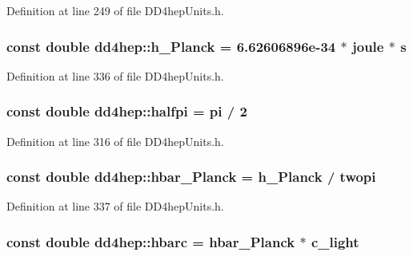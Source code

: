 Definition at line 249 of file DD4hepUnits.h.\hypertarget{namespacedd4hep_a673d90bb18d025dec577177927fac9f0}{
\subsubsection[{h\_\-Planck}]{\setlength{\rightskip}{0pt plus 5cm}const double {\bf dd4hep::h\_\-Planck} = 6.62606896e-\/34 $\ast$ joule $\ast$ s}}
\label{namespacedd4hep_a673d90bb18d025dec577177927fac9f0}


Definition at line 336 of file DD4hepUnits.h.\hypertarget{namespacedd4hep_a6681c641778caec7c8626e0d666a1be7}{
\subsubsection[{halfpi}]{\setlength{\rightskip}{0pt plus 5cm}const double {\bf dd4hep::halfpi} = {\bf pi} / 2}}
\label{namespacedd4hep_a6681c641778caec7c8626e0d666a1be7}


Definition at line 316 of file DD4hepUnits.h.\hypertarget{namespacedd4hep_abb25342c5e225d62446e9546e412bdcf}{
\subsubsection[{hbar\_\-Planck}]{\setlength{\rightskip}{0pt plus 5cm}const double {\bf dd4hep::hbar\_\-Planck} = {\bf h\_\-Planck} / {\bf twopi}}}
\label{namespacedd4hep_abb25342c5e225d62446e9546e412bdcf}


Definition at line 337 of file DD4hepUnits.h.\hypertarget{namespacedd4hep_aee6340c5f86bb7ae1edcc2a90efa056e}{
\subsubsection[{hbarc}]{\setlength{\rightskip}{0pt plus 5cm}const double {\bf dd4hep::hbarc} = {\bf hbar\_\-Planck} $\ast$ {\bf c\_\-light}}}
\label{namespacedd4hep_aee6340c5f86bb7ae1edcc2a90efa056e}


